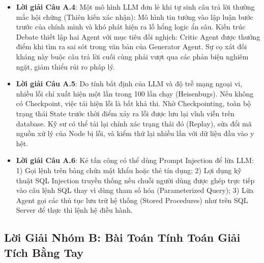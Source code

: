 \begin{itemize}
  \item \textbf{Lời giải Câu A.4}:
  Một mô hình LLM đơn lẻ khi tự sinh câu trả lời thường mắc hội chứng  (Thiên kiến xác nhận): Mô hình tin tưởng vào lập luận bước trước của chính mình và khó phát hiện ra lỗ hổng logic ẩn sâu. Kiến trúc Debate thiết lập hai Agent với mục tiêu đối nghịch: Critic Agent được thưởng điểm khi tìm ra sai sót trong văn bản của Generator Agent. Sự cọ xát đối kháng này buộc câu trả lời cuối cùng phải vượt qua các phản biện nghiêm ngặt, giảm thiểu rủi ro pháp lý.

  \item \textbf{Lời giải Câu A.5}:
  Do tính bất định của LLM và độ trễ mạng ngoại vi, nhiều lỗi chỉ xuất hiện một lần trong 100 lần chạy (Heisenbugs). Nếu không có Checkpoint, việc tái hiện lỗi là bất khả thi. Nhờ Checkpointing, toàn bộ trạng thái State trước thời điểm xảy ra lỗi được lưu lại vĩnh viễn trên database. Kỹ sư có thể tải lại chính xác trạng thái đó (Replay), sửa đổi mã nguồn xử lý của Node bị lỗi, và kiểm thử lại nhiều lần với dữ liệu đầu vào y hệt.

  \item \textbf{Lời giải Câu A.6}:
  Kẻ tấn công có thể dùng Prompt Injection để lừa LLM:
  1) Gọi lệnh  trên bảng chứa mật khẩu hoặc thẻ tín dụng;
  2) Lợi dụng kỹ thuật SQL Injection truyền thống nếu chuỗi người dùng được ghép trực tiếp vào câu lệnh SQL thay vì dùng tham số hóa (Parameterized Query);
  3) Lừa Agent gọi các thủ tục lưu trữ hệ thống (Stored Procedures) như  trên SQL Server để thực thi lệnh hệ điều hành.
\end{itemize}

\subsection{Lời Giải Nhóm B: Bài Toán Tính Toán Giải Tích Bằng Tay}

